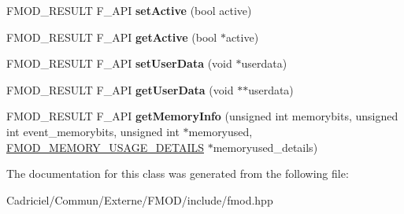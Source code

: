 \begin{DoxyCompactItemize}
\item 
F\+M\+O\+D\+\_\+\+R\+E\+S\+U\+LT F\+\_\+\+A\+PI {\bfseries set\+Active} (bool active)\hypertarget{class_f_m_o_d_1_1_reverb_ace7f7f68d6f6298a356b9ee831f50aae}{}\label{class_f_m_o_d_1_1_reverb_ace7f7f68d6f6298a356b9ee831f50aae}

\item 
F\+M\+O\+D\+\_\+\+R\+E\+S\+U\+LT F\+\_\+\+A\+PI {\bfseries get\+Active} (bool $\ast$active)\hypertarget{class_f_m_o_d_1_1_reverb_a50f3bbcec09517e400fa606330738e2b}{}\label{class_f_m_o_d_1_1_reverb_a50f3bbcec09517e400fa606330738e2b}

\item 
F\+M\+O\+D\+\_\+\+R\+E\+S\+U\+LT F\+\_\+\+A\+PI {\bfseries set\+User\+Data} (void $\ast$userdata)\hypertarget{class_f_m_o_d_1_1_reverb_ad29004efcf52bf367bc13fde07527647}{}\label{class_f_m_o_d_1_1_reverb_ad29004efcf52bf367bc13fde07527647}

\item 
F\+M\+O\+D\+\_\+\+R\+E\+S\+U\+LT F\+\_\+\+A\+PI {\bfseries get\+User\+Data} (void $\ast$$\ast$userdata)\hypertarget{class_f_m_o_d_1_1_reverb_ac12115e79aebe3f8150c971b75de38c7}{}\label{class_f_m_o_d_1_1_reverb_ac12115e79aebe3f8150c971b75de38c7}

\item 
F\+M\+O\+D\+\_\+\+R\+E\+S\+U\+LT F\+\_\+\+A\+PI {\bfseries get\+Memory\+Info} (unsigned int memorybits, unsigned int event\+\_\+memorybits, unsigned int $\ast$memoryused, \hyperlink{struct_f_m_o_d___m_e_m_o_r_y___u_s_a_g_e___d_e_t_a_i_l_s}{F\+M\+O\+D\+\_\+\+M\+E\+M\+O\+R\+Y\+\_\+\+U\+S\+A\+G\+E\+\_\+\+D\+E\+T\+A\+I\+LS} $\ast$memoryused\+\_\+details)\hypertarget{class_f_m_o_d_1_1_reverb_a9be1262ba585537bdd32e569eb999d05}{}\label{class_f_m_o_d_1_1_reverb_a9be1262ba585537bdd32e569eb999d05}

\end{DoxyCompactItemize}


The documentation for this class was generated from the following file\+:\begin{DoxyCompactItemize}
\item 
Cadriciel/\+Commun/\+Externe/\+F\+M\+O\+D/include/fmod.\+hpp\end{DoxyCompactItemize}
